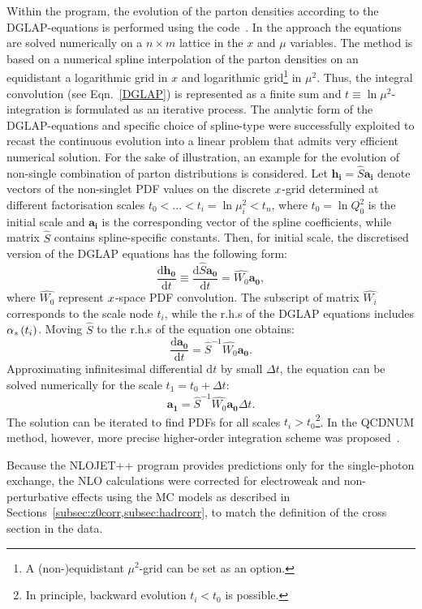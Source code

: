 Within the \herafitter program, the evolution of the parton densities according to the DGLAP-equations is performed using the \qcdnum code~\cite{Botje:2010ay}. In the \qcdnum approach the equations are solved numerically on a $n\times m$ lattice in the $x$ and $\mu$ variables. The method is based on a numerical spline interpolation of the parton densities on an equidistant a logarithmic grid in $x$ and logarithmic grid\footnote{A (non-)equidistant $\mu^2$-grid can be set as an option.} in $\mu^2$. Thus, the integral convolution (see Eqn.~\ref{DGLAP}) is represented as a finite sum and $t \equiv \ln{\mu^2}$-integration is formulated as an iterative process.
The analytic form of the DGLAP-equations and specific choice of spline-type were successfully exploited to recast the continuous evolution into a linear problem that admits very efficient numerical solution. For the sake of illustration, an example for the evolution of non-single combination of parton distributions is considered. Let $\mathbf{h_i}=\hat{S}\mathbf{a_i}$ denote vectors of the non-singlet PDF values on the discrete $\mbox{${x}$}$-grid determined at different factorisation scales $t_0 < ... < t_i=\ln{\mu^2_i} < t_n$, where $t_0=\ln{Q^2_0}$ is the initial scale and $\mathbf{a_i}$ is the corresponding vector of the spline coefficients, while matrix $\hat{S}$ contains spline-specific constants. Then, for initial scale, the discretised version of the DGLAP equations has the following form:
\begin{equation}
 \frac{\mathrm{d}\mathbf{h_0}}{\mathrm{d}t} \equiv \frac{\mathrm{d}\hat{S}\mathbf{a_0}}{\mathrm{d}t} = \hat{W_0}\mathbf{a_0},
\end{equation}
where $\hat{W_0}$ represent $\mbox{${x}$}$-space PDF convolution. The subscript of matrix $\hat{W_i}$ corresponds to the scale node $t_i$, while the r.h.s of the DGLAP equations includes $\mbox{$\alpha_{s}$}\left(t_i\right)$. Moving $\hat{S}$ to the r.h.s of the equation one obtains:
\begin{equation}
 \frac{\mathrm{d}\mathbf{a_0}}{\mathrm{d}t} = \hat{S}^{-1}\hat{W_0}\mathbf{a_0}.
\end{equation}
Approximating infinitesimal differential $\mathrm{d}t$ by small $\Delta t$, the equation can be solved numerically for the scale $t_1=t_0+\Delta t$:
\begin{equation}
 \mathbf{a_1} = \hat{S}^{-1}\hat{W_0}\mathbf{a_0}\Delta t.
\end{equation}
The solution can be iterated to find PDFs for all scales $t_i>t_0$\footnote{In principle, backward evolution $t_i<t_0$ is possible.}. In the QCDNUM method, however, more precise higher-order integration scheme was proposed~\cite{Botje:2010ay}.

Because the NLOJET++ program provides predictions only for the single-photon exchange, the NLO calculations were corrected for electroweak and non-perturbative effects using the MC models as described in Sections~\ref{subsec:z0corr,subsec:hadrcorr}, to match the definition of the cross section in the data.
